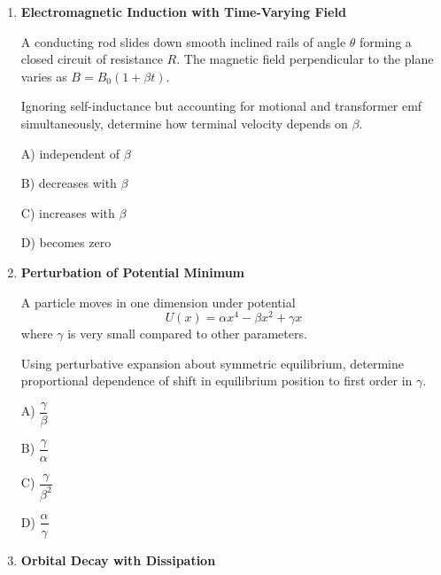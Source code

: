\documentclass[12pt]{article}
\begin{document}
\begin{enumerate}
A) $ \sqrt{\dfrac{g}{h}} $

B) $ \sqrt{\dfrac{Mg}{mh}} $

C) $ \sqrt{\dfrac{(M+2m)g}{mh}} $

D) $ \sqrt{\dfrac{mg}{Mh}} $

\item \textbf{Electromagnetic Induction with Time-Varying Field} 

A conducting rod slides down smooth inclined rails of angle $\theta$ forming a closed circuit of resistance $R$. The magnetic field perpendicular to the plane varies as $B=B_0(1+\beta t)$.

Ignoring self-inductance but accounting for motional and transformer emf simultaneously, determine how terminal velocity depends on $\beta$.



\begin{center}
\end{center}

A) independent of $\beta$

B) decreases with $\beta$

C) increases with $\beta$

D) becomes zero

\item \textbf{Perturbation of Potential Minimum}

A particle moves in one dimension under potential
\[
U(x)=\alpha x^4-\beta x^2+\gamma x
\]
where $\gamma$ is very small compared to other parameters.

Using perturbative expansion about symmetric equilibrium, determine proportional dependence of shift in equilibrium position to first order in $\gamma$.

A) $ \dfrac{\gamma}{\beta} $

B) $ \dfrac{\gamma}{\alpha} $

C) $ \dfrac{\gamma}{\beta^2} $

D) $ \dfrac{\alpha}{\gamma} $

\item \textbf{Orbital Decay with Dissipation}


\end{enumerate}
\end{document}
